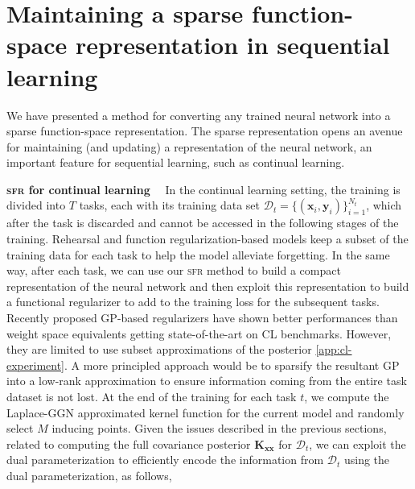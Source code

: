 \documentclass{article}
\renewcommand{\paragraph}[1]{{\bf #1}~~}
\newcommand{\our}{\textsc{sfr}\xspace}
\newcommand{\dataset}{\ensuremath{\mathcal{D}}}
\newcommand{\mbf}[1]{\mathbf{#1}}
\newcommand{\MX}{\mbf{X}}
\newcommand{\MKxx}{\mbf{K}_{\mbf{x}\mbf{x}}}
\begin{document}
\section{Maintaining a sparse function-space representation in sequential learning}
\label{sec:sequential}
%
We have presented a method for converting any trained neural network into a sparse function-space representation. The sparse representation opens an avenue for maintaining (and updating) a representation of the neural network, an important feature for sequential learning, such as continual learning.



\paragraph{\our for continual learning}
In the continual learning setting, the training is divided into $T$ tasks, each with its training data set $\dataset_t = \{(\mathbf{x}_{i}, \mathbf{y}_{i})\}_{i=1}^{N_t}$, which after the task is discarded and cannot be accessed in the following stages of the training. Rehearsal and function regularization-based models keep a subset of the training data for each task to help the model alleviate forgetting. In the same way, after each task, we can use our \our method to build a compact representation of the neural network and then exploit this representation to build a functional regularizer to add to the training loss for the subsequent tasks. Recently proposed GP-based regularizers \cite{ pan2020continual, rudner2022continual} have shown better performances than weight space equivalents getting state-of-the-art on CL benchmarks. However, they are limited to use subset approximations of the posterior \cref{app:cl-experiment}.
A more principled approach would be to sparsify the resultant GP into a low-rank approximation to ensure information coming from the entire task dataset is not lost. %
At the end of the training for each task $t$, we compute the Laplace-GGN approximated kernel function for the current model and randomly select $M$ inducing points. Given the issues described in the previous sections, related to computing the full covariance posterior $\MKxx$ for $\dataset_t$,\todo{this should be $\kappa(\MX_t, \MX_t)$} we can exploit the dual parameterization to efficiently encode the information from  $\dataset_t$ using the dual parameterization, as follows, 
\end{document}
